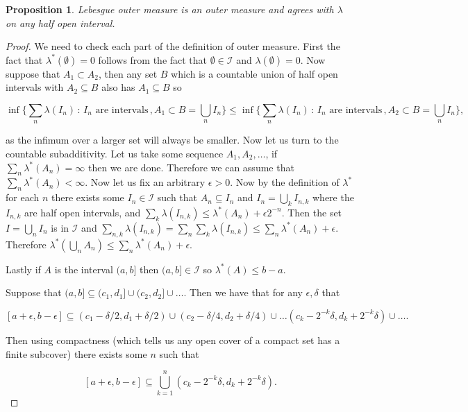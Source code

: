 \documentclass[
]{book}
\newtheorem{proposition}{Proposition}[chapter]
\theoremstyle{definition}
\theoremstyle{definition}
\theoremstyle{definition}
\theoremstyle{definition}
\theoremstyle{remark}
\begin{document}
\begin{proposition}
Lebesgue outer measure is an outer measure and agrees with \(\lambda\) on any half open interval.
\end{proposition}

\begin{proof}
We need to check each part of the definition of outer measure. First the fact that \(\lambda^*(\emptyset) = 0\) follows from the fact that \(\emptyset \in \mathcal{I}\) and \(\lambda(\emptyset) = 0\). Now suppose that \(A_1 \subset A_2\), then any set \(B\) which is a countable union of half open intervals with \(A_2 \subseteq B\) also has \(A_1 \subseteq B\) so

\[ \inf \{ \sum_n\lambda (I_n) \, : \, \mbox{$I_n$ are intervals}\,, A_1 \subset B = \bigcup_n I_n\} \leq \inf \{ \sum_n\lambda (I_n) \, : \, \mbox{$I_n$ are intervals}\,, A_2 \subset B = \bigcup_n I_n\}, \]

as the infimum over a larger set will always be smaller. Now let us turn to the countable subadditivity. Let us take some sequence \(A_1, A_2, \dots\), if \(\sum_n \lambda^*(A_n) = \infty\) then we are done. Therefore we can assume that \(\sum_n \lambda^*(A_n) < \infty\). Now let us fix an arbitrary \(\epsilon>0\). Now by the definition of \(\lambda^*\) for each \(n\) there exists some \(I_n \in \mathcal{I}\) such that \(A_n \subseteq I_n\) and \(I_n = \bigcup_k I_{n,k}\) where the \(I_{n,k}\) are half open intervals, and \(\sum_k\lambda(I_{n,k}) \leq \lambda^* (A_n) + \epsilon 2^{-n}\). Then the set \(I = \bigcup_n I_n\) is in \(\mathcal{I}\) and \(\sum_{n,k}\lambda(I_{n,k}) = \sum_n \sum_k\lambda(I_{n,k}) \leq \sum_n \lambda^*(A_n) + \epsilon\). Therefore \(\lambda^*(\bigcup_n A_n) \leq \sum_n \lambda^*(A_n) + \epsilon\).

Lastly if \(A\) is the interval \((a,b]\) then \((a,b] \in \mathcal{I}\) so \(\lambda^*(A) \leq b-a\).

Suppose that \((a,b] \subseteq (c_1,d_1] \cup (c_2, d_2] \cup \dots\). Then we have that for any \(\epsilon, \delta\) that

\[ [a+\epsilon, b-\epsilon] \subseteq (c_1-\delta/2, d_1 + \delta/2) \cup (c_2 - \delta/4, d_2 + \delta/4) \cup \dots (c_k -2^{-k} \delta, d_k + 2^{-k} \delta) \cup \dots.  \]

Then using compactness (which tells us any open cover of a compact set has a finite subcover) there exists some \(n\) such that

\[ [a+\epsilon, b-\epsilon] \subseteq \bigcup_{k=1}^n (c_k -2^{-k}\delta, d_k + 2^{-k} \delta). \]


\end{proof}
\end{document}

